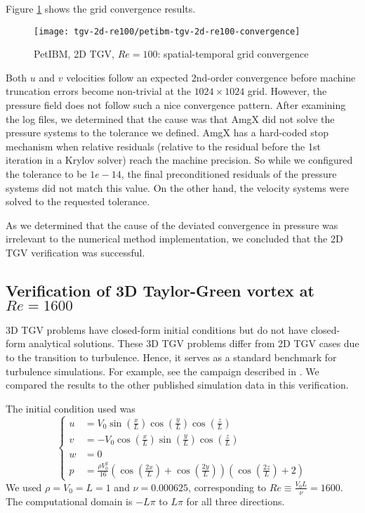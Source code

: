 Figure \ref{fig:petibm-tgv2d-re100-conv} shows the grid convergence results.
\begin{figure}[hbt!]
    \texttt{[image: tgv-2d-re100/petibm-tgv-2d-re100-convergence]}
    \caption{PetIBM, 2D TGV, $Re=100$: spatial-temporal grid convergence}
    \label{fig:petibm-tgv2d-re100-conv}
\end{figure}
Both $u$ and $v$ velocities follow an expected 2nd-order convergence before machine truncation errors become non-trivial at the $1024 \times 1024$ grid.
However, the pressure field does not follow such a nice convergence pattern.
After examining the log files, we determined that the cause was that AmgX did not solve the pressure systems to the tolerance we defined.
AmgX has a hard-coded stop mechanism when relative residuals (relative to the residual before the 1st iteration in a Krylov solver) reach the machine precision.
So while we configured the tolerance to be $1e-14$, the final preconditioned residuals of the pressure systems did not match this value.
On the other hand, the velocity systems were solved to the requested tolerance.

As we determined that the cause of the deviated convergence in pressure was irrelevant to the numerical method implementation, we concluded that the 2D TGV verification was successful.

\subsection*{Verification of 3D Taylor-Green vortex at $Re=1600$}

3D TGV problems have closed-form initial conditions but do not have closed-form analytical solutions.
These 3D TGV problems differ from 2D TGV cases due to the transition to turbulence.
Hence, it serves as a standard benchmark for turbulence simulations.
For example, see the campaign described in \cite{noauthor_1st_2012}. 
We compared the results to the other published simulation data \cite{debonis_solutions_2013} in this verification.

The initial condition used was
\begin{equation}\label{eq:tgv3d-ic}
    \left\{
    \begin{aligned}
        u &=V_{0} \sin \left(\frac{x}{L}\right) \cos \left(\frac{y}{L}\right) \cos \left(\frac{z}{L}\right) \\
        v &=-V_{0} \cos \left(\frac{x}{L}\right) \sin \left(\frac{y}{L}\right) \cos \left(\frac{z}{L}\right) \\
        w &=0 \\
        p &=\frac{\rho V_{0}^{2}}{16}\left(\cos \left(\frac{2 x}{L}\right)+\cos \left(\frac{2 y}{L}\right)\right)\left(\cos \left(\frac{2 z}{L}\right)+2\right)
    \end{aligned}
    \right.
\end{equation}
We used $\rho = V_0 = L = 1$ and $\nu=0.000625$, corresponding to $Re \equiv \frac{V_0 L}{\nu} = 1600$.
The computational domain is $-L\pi$ to $L\pi$ for all three directions.

